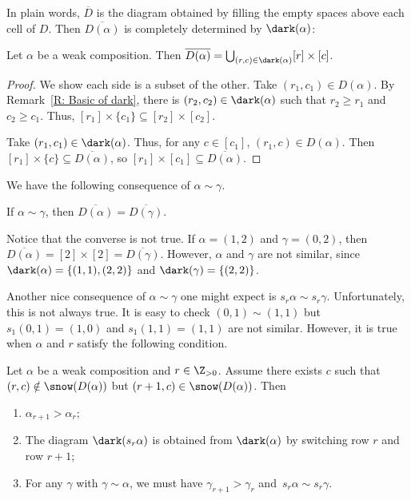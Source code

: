 In plain words, $\overline{D}$ is the diagram obtained
by filling the empty spaces above each cell of $D$.
Then $\overline{D(\alpha)}$ is completely determined 
by $\dark(\alpha)$:
\begin{lemma}
Let $\alpha$ be a weak composition.
Then $\overline{D(\alpha)} = \bigcup_{(r,c) \in \dark(\alpha)} [r] \times [c]$.
\end{lemma}
\begin{proof}
We show each side is a subset of the other. 
Take $(r_1,c_1) \in D(\alpha)$. 
By Remark~\ref{R: Basic of dark},
there is $(r_2, c_2) \in \dark(\alpha)$ such that 
$r_2 \geqslant r_1$ and $c_2 \geqslant c_1$.
Thus, $[r_1] \times \{c_1\} \subseteq [r_2] \times [c_2]$.

Take $(r_1,c_1) \in \dark(\alpha)$.
Thus, for any $c \in [c_1]$, 
$(r_1,c) \in D(\alpha)$.
Then $[r_1] \times \{c\} \subseteq \overline{D(\alpha)}$,
so $[r_1] \times [c_1] \subseteq \overline{D(\alpha)}$. 
\end{proof}

We have the following consequence of 
$\alpha \sim \gamma$.

\begin{cor}
\label{C: sim implies same overline}
If $\alpha \sim \gamma$,
then $\overline{D(\alpha)} = \overline{D(\gamma)}$.
\end{cor}
Notice that the converse is not true. 
If $\alpha = (1,2)$ and $\gamma = (0,2)$,
then $\overline{D(\alpha)} = [2] \times [2]
=  \overline{D(\gamma)}$.
However, $\alpha$ and $\gamma$ are not similar,
since $\dark(\alpha) = \{ (1,1), (2,2)\}$
and $\dark(\gamma) = \{(2,2)\}$.

Another nice consequence of $\alpha \sim \gamma$ one might expect
is $s_r \alpha \sim s_r \gamma$.
Unfortunately, this is not always true. 
It is easy to check $(0,1) \sim (1,1)$
but $s_1(0,1) = (1,0)$  and $s_1(1,1) = (1,1)$ are not similar. 
However, it is true
when $\alpha$ and $r$ satisfy 
the following condition.

\begin{lemma}
\label{L: s_i fix sim}
Let $\alpha$ be a weak composition and $r\in \Z_{>0}$.
Assume there exists $c$
such that $(r, c)\notin \snow(D(\alpha))$
but $(r+1, c)\in \snow(D(\alpha))$.
Then 
\begin{enumerate}
\item[(i)] $\alpha_{r+1} > \alpha_r$;
\item[(ii)] The diagram $\dark(s_r \alpha)$
is obtained from $\dark(\alpha)$
by switching row $r$ and row $r+1$;
\item[(iii)] For any $\gamma$ with
$\gamma \sim \alpha$,
we must have $\gamma_{r+1} > \gamma_{r}$ 
and~$s_r\alpha \sim s_r\gamma$.
\end{enumerate}
\end{lemma}

